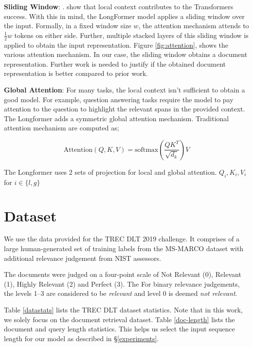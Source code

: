 \documentclass[sigconf, nonacm=true]{acmart}
\begin{document}
\textbf{Sliding Window}: \cite{Beltagy2020LongformerTL}. \citeauthor{Kovaleva2019RevealingTD} show that local context contributes to the Transformers success. With this in mind, the LongFormer model applies a sliding window over the input. Formally, in a fixed window size $w$, the attention mechanism attends to $\frac{1}{2} w$ tokens on either side. Further, multiple stacked layers of this sliding window is applied to obtain the input representation. Figure \ref{fig:attention}, shows the various attention mechanism. In our case, the sliding window obtains a document representation. Further work is needed to justify if the obtained document representation is better compared to prior work. \\

\smallskip

\noindent \textbf{Global Attention}: For many tasks, the local context isn't sufficient to obtain a good model. For example, question answering tasks require the model to pay attention to the question to highlight the relevant spans in the provided context. The Longformer adds a symmetric global attention mechanism. Traditional attention mechanism \cite{Vaswani2017AttentionIA} are computed as;

\begin{equation}
  \text{Attention}(Q, K, V) = \text{softmax}\left( \frac{QK^T}{\sqrt{d_k}}\right) V
\end{equation}

The Longformer uses 2 sets of projection for local and global attention. $Q_i, K_i, V_i$ for $i \in \{ l, g\}$

\section{Dataset} \label{dataset}

We use the data provided for the TREC DLT 2019 challenge. It comprises of a large human-generated set of training labels from the MS-MARCO dataset \cite{Campos2016MSMA} with additional relevance judgement from NIST assessors.

The documents were judged on a four-point scale of Not Relevant (0), Relevant (1), Highly Relevant (2) and Perfect (3). The For binary relevance judgements, the levels 1--3 are considered to be \textit{relevant} and level 0 is deemed \textit{not relevant}.

Table \ref{datastats} lists the TREC DLT dataset statistics. Note that in this work, we solely focus on the document retrieval dataset. Table \ref{doc-length} lists the document and query length statistics. This helps us select the input sequence length for our model as described in \S \ref{experiments}.
\end{document}
